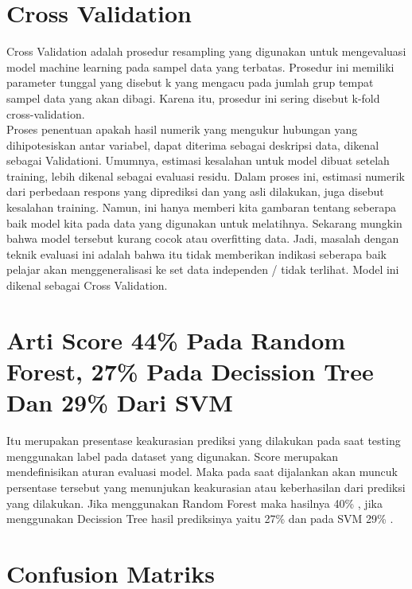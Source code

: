 \section{Cross Validation}
Cross Validation adalah prosedur resampling yang digunakan untuk mengevaluasi model machine learning pada sampel data yang terbatas. Prosedur ini memiliki parameter tunggal yang disebut k yang mengacu pada jumlah grup tempat sampel data yang akan dibagi. Karena itu, prosedur ini sering disebut k-fold cross-validation.\\
Proses penentuan apakah hasil numerik yang mengukur hubungan yang dihipotesiskan antar variabel, dapat diterima sebagai deskripsi data, dikenal sebagai Validationi. Umumnya, estimasi kesalahan untuk model dibuat setelah training, lebih dikenal sebagai evaluasi residu. Dalam proses ini, estimasi numerik dari perbedaan respons yang diprediksi dan yang asli dilakukan, juga disebut kesalahan training. Namun, ini hanya memberi kita gambaran tentang seberapa baik model kita pada data yang digunakan untuk melatihnya. Sekarang mungkin bahwa model tersebut kurang cocok atau overfitting data. Jadi, masalah dengan teknik evaluasi ini adalah bahwa itu tidak memberikan indikasi seberapa baik pelajar akan menggeneralisasi ke set data independen / tidak terlihat. Model ini dikenal sebagai Cross Validation.

\section{Arti Score 44\% Pada Random Forest, 27\% Pada Decission Tree Dan 29\% Dari SVM}
Itu merupakan presentase keakurasian prediksi yang dilakukan pada saat testing menggunakan label pada dataset yang digunakan. Score merupakan mendefinisikan aturan evaluasi model. Maka pada saat dijalankan akan muncuk persentase tersebut yang menunjukan keakurasian atau keberhasilan dari prediksi yang dilakukan. Jika menggunakan Random Forest maka hasilnya 40\% , jika menggunakan Decission Tree hasil prediksinya yaitu 27\% dan pada SVM 29\% .

\section{Confusion Matriks}
